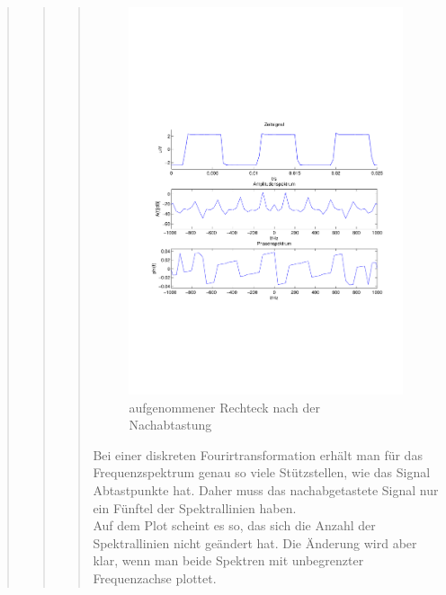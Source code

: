 \begin{quote}
\begin{quote}
\begin{quote}
            \begin{figure}[H]
            \centering
                \includegraphics[scale=0.7, trim = 1.5cm 6.5cm 1cm 7.5cm,
                clip]{./Bilder/rechteck_100Hz_15kHz_3kHz_nachabgetastet_frequenzbegrenzung.pdf}
                    \caption{aufgenommener Rechteck nach der Nachabtastung}
            \end{figure}
  
            Bei einer diskreten Fourirtransformation erhält man für das Frequenzspektrum genau so viele
            Stützstellen, wie das Signal Abtastpunkte hat. Daher muss das nachabgetastete Signal nur ein    
            Fünftel der Spektrallinien haben.\\
            Auf dem Plot scheint es so, das sich die Anzahl der Spektrallinien nicht geändert hat. Die Änderung 
            wird aber klar, wenn man beide Spektren mit unbegrenzter Frequenzachse plottet.
            

\end{quote}
\end{quote}
\end{quote}
